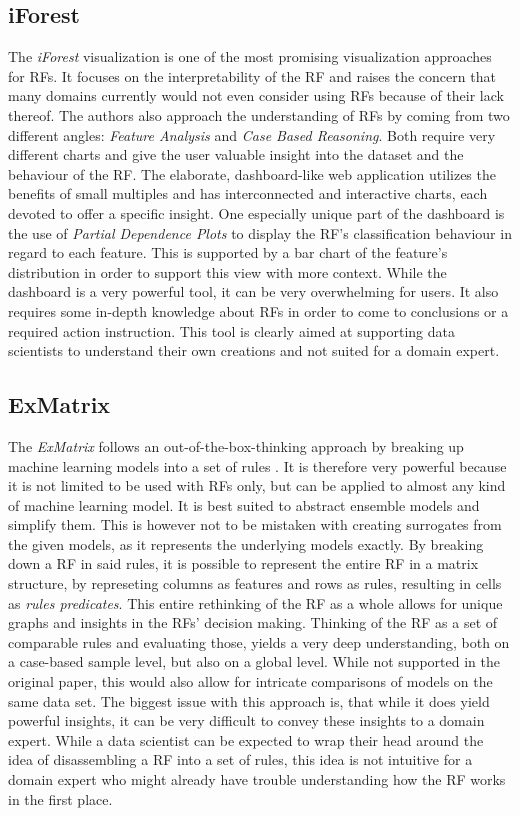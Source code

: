 \documentclass[a4paper, 12pt]{article}
\begin{document}
\subsection{iForest}
The \textit{iForest} visualization is one of the most promising visualization approaches for RFs.
\cite{zhao2018iforest} It focuses on the interpretability of the RF and raises the concern
that many domains currently would not even consider using RFs because of their lack thereof.
The authors also approach the understanding of RFs by coming from two different angles:
\textit{Feature Analysis} and \textit{Case Based Reasoning}.
Both require very different charts and give the user valuable insight into the dataset and
the behaviour of the RF. The elaborate, dashboard-like web application utilizes the benefits
of small multiples and has interconnected and interactive charts, each devoted to offer a
specific insight. One especially unique part of the dashboard is the use of
\textit{Partial Dependence Plots} to display the RF's classification behaviour in regard to
each feature. This is supported by a bar chart of the feature's distribution in order to
support this view with more context.
While the dashboard is a very powerful tool, it can be very overwhelming for users. It also
requires some in-depth knowledge about RFs in order to come to conclusions or a required
action instruction. This tool is clearly aimed at supporting data scientists to understand
their own creations and not suited for a domain expert.

\subsection{ExMatrix}
The \textit{ExMatrix} follows an out-of-the-box-thinking approach by breaking up machine
learning models into a set of rules \cite{neto2020explainable} \cite{ming2018rulematrix}. It is therefore very powerful because it is not limited
to be used with RFs only, but can be applied to almost any kind of machine learning model.
It is best suited to abstract ensemble models and simplify them. This is however not to be
mistaken with creating surrogates from the given models, as it represents the underlying
models exactly. By breaking down a RF in said rules, it is possible to represent the entire
RF in a matrix structure, by represeting columns as features and rows as rules, resulting in
cells as \textit{rules predicates}. This entire rethinking of the RF as a whole allows for
unique graphs and insights in the RFs' decision making. Thinking of the RF as a set of
comparable rules and evaluating those, yields a very deep understanding, both on a
case-based sample level, but also on a global level. While not supported in the original
paper, this would also allow for intricate comparisons of models on the same data set.
The biggest issue with this approach is, that while it does yield powerful insights, it can
be very difficult to convey these insights to a domain expert. While a data scientist can be
expected to wrap their head around the idea of disassembling a RF into a set of rules, this
idea is not intuitive for a domain expert who might already have trouble understanding how
the RF works in the first place.
\end{document}
